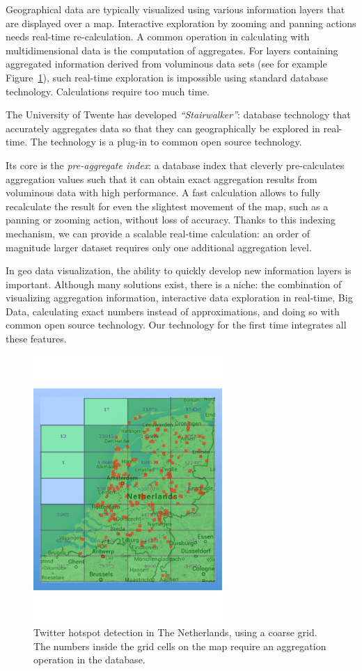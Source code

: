 Geographical data are typically visualized using various information layers
that are displayed over a map. Interactive exploration by zooming and
panning actions needs real-time re-calculation. A common operation in
calculating with multidimensional data is the computation of aggregates.
For layers containing aggregated information derived from voluminous data
sets (see for example Figure~\ref{fig:NL-screenshot}), such real-time
exploration is impossible using standard database technology. Calculations
require too much time.

The University of Twente has developed \emph{``Stairwalker''}: database
technology that accurately aggregates data so that they can geographically
be explored in real-time. The technology is a plug-in to common open
source technology.

Its core is the \emph{pre-aggregate index}: a database index that cleverly
pre-calculates aggregation values such that it can obtain exact aggregation
results from voluminous data with high performance.  A fast calculation
allows to fully recalculate the result for even the slightest movement of
the map, such as a panning or zooming action, without loss of accuracy.
Thanks to this indexing mechanism, we can provide a scalable real-time
calculation: an order of magnitude larger dataset requires only one
additional aggregation level.

In geo data visualization, the ability to quickly develop new information
layers is important. Although many solutions exist, there is a niche: the
combination of visualizing aggregation information, interactive data
exploration in real-time, Big Data, calculating exact numbers instead of
approximations, and doing so with common open source technology. Our
technology for the first time integrates all these features.

\begin{figure}[t]
\centering
\includegraphics[height=4in]{Figures/NL-screenshot.pdf}
\caption{Twitter hotspot detection in The Netherlands, using a coarse grid.
The numbers inside the grid cells on the map require an aggregation
operation in the database.}
\label{fig:NL-screenshot}
\end{figure}


